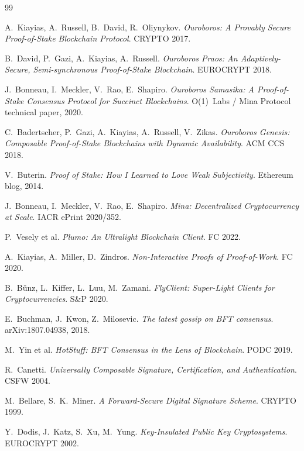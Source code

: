 \documentclass[10pt]{article}
\begin{document}
{\small
\begin{thebibliography}{99}
\setlength{\itemsep}{0pt}\setlength{\parskip}{0pt}\setlength{\parsep}{0pt}

A.~Kiayias, A.~Russell, B.~David, R.~Oliynykov.
\emph{Ouroboros: A Provably Secure Proof-of-Stake Blockchain Protocol}.
CRYPTO 2017.

B.~David, P.~Gazi, A.~Kiayias, A.~Russell.
\emph{Ouroboros Praos: An Adaptively-Secure, Semi-synchronous
Proof-of-Stake Blockchain}. EUROCRYPT 2018.

J.~Bonneau, I.~Meckler, V.~Rao, E.~Shapiro.
\emph{Ouroboros Samasika: A Proof-of-Stake Consensus Protocol for
Succinct Blockchains}. O(1)~Labs / Mina Protocol technical paper, 2020.

C.~Badertscher, P.~Gazi, A.~Kiayias, A.~Russell, V.~Zikas.
\emph{Ouroboros Genesis: Composable Proof-of-Stake Blockchains with
Dynamic Availability}. ACM CCS 2018.

V.~Buterin. \emph{Proof of Stake: How I Learned to Love Weak
Subjectivity}. Ethereum blog, 2014.

J.~Bonneau, I.~Meckler, V.~Rao, E.~Shapiro.
\emph{Mina: Decentralized Cryptocurrency at Scale}. IACR ePrint 2020/352.

P.~Vesely et al.
\emph{Plumo: An Ultralight Blockchain Client}. FC
2022.

A.~Kiayias, A.~Miller, D.~Zindros.
\emph{Non-Interactive Proofs of Proof-of-Work}. FC
2020.

B.~B\"unz, L.~Kiffer, L.~Luu, M.~Zamani.
\emph{FlyClient: Super-Light Clients for Cryptocurrencies}. S\&P 2020.

E.~Buchman, J.~Kwon, Z.~Milosevic.
\emph{The latest gossip on BFT consensus}. arXiv:1807.04938, 2018.

M.~Yin et al.
\emph{HotStuff: BFT Consensus in the Lens of Blockchain}. PODC 2019.

R.~Canetti.
\emph{Universally Composable Signature, Certification, and
Authentication}. CSFW 2004.

M.~Bellare, S.~K.~Miner.
\emph{A Forward-Secure Digital Signature Scheme}. CRYPTO 1999.

Y.~Dodis, J.~Katz, S.~Xu, M.~Yung.
\emph{Key-Insulated Public Key Cryptosystems}. EUROCRYPT 2002.


\end{thebibliography}}
\end{document}
